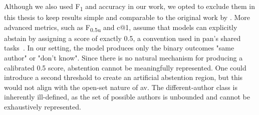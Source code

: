 
Although we also used F\textsubscript{1} and accuracy in our work, we opted to exclude them in this thesis to keep results simple and comparable to the original work by \citet{koppel_determining_2014}.
More advanced metrics, such as F\textsubscript{0.5u} and c@1, assume that models can explicitly abstain by assigning a score of exactly 0.5, a convention used in \acs{pan}'s shared tasks~\citep{tyo_state_2022,bevendorff_overview_2024,kocher_unine_2015}. 
In our setting, the model produces only the binary outcomes "same author" or "don't know". 
Since there is no natural mechanism for producing a calibrated 0.5 score, abstention cannot be meaningfully represented. 
One could introduce a second threshold to create an artificial abstention region, but this would not align with the open-set nature of \ac{av}. 
The different-author class is inherently ill-defined, as the set of possible authors is unbounded and cannot be exhaustively represented. 

